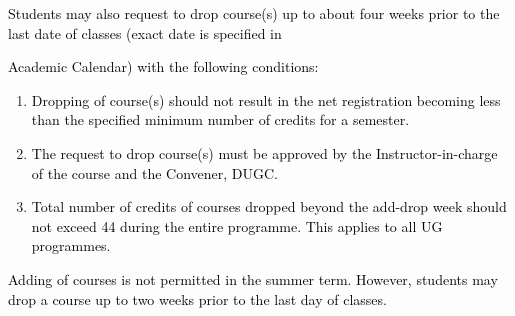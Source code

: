 \documentclass[12pt]{article}
\begin{document}
\vspace{\baselineskip}
{\fontsize{9pt}{10.8pt}\selectfont \textcolor[HTML]{00000A}{Students may also request to drop course(s) up to about four weeks prior to the last date of classes (exact date is specified in}\par}\par


\vspace{\baselineskip}
{\fontsize{10pt}{12.0pt}\selectfont \textcolor[HTML]{00000A}{Academic Calendar) with the following conditions:}\par}\par


\vspace{\baselineskip}
\begin{enumerate}
	\item {\fontsize{10pt}{12.0pt}\selectfont \textcolor[HTML]{00000A}{Dropping of course(s) should not result in the net registration becoming less than the specified minimum number of credits for a semester.}\par}\par


\vspace{\baselineskip}
	\item {\fontsize{9pt}{10.8pt}\selectfont \textcolor[HTML]{00000A}{The request to drop course(s) must be approved by the Instructor-in-charge of the course and the Convener, DUGC.}\par}\par


\vspace{\baselineskip}
	\item {\fontsize{10pt}{12.0pt}\selectfont \textcolor[HTML]{00000A}{Total number of credits of courses dropped beyond the add-drop week should not exceed 44 during the entire programme. This applies to all UG programmes.}\par}
\end{enumerate}\par


\vspace{\baselineskip}
\begin{adjustwidth}{0.0in}{0.15in}
{\fontsize{10pt}{12.0pt}\selectfont \textcolor[HTML]{00000A}{Adding of courses is not permitted in the summer term. However, students may drop a course up to two weeks prior to the last day of classes.}\par}\par

\end{adjustwidth}
\end{document}
